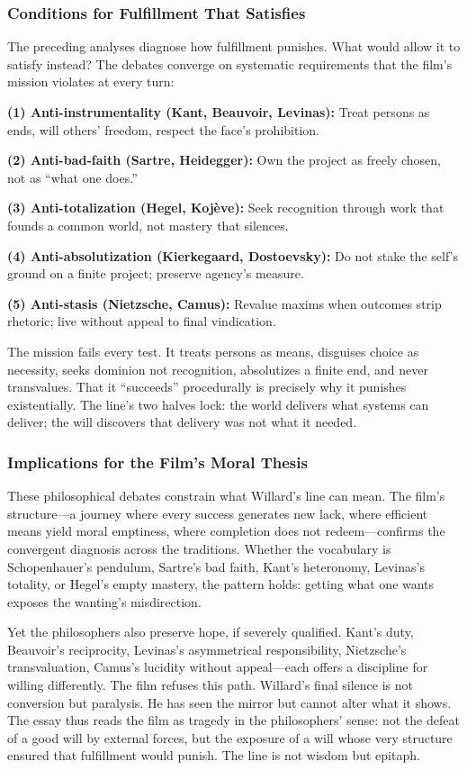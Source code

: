 \subsubsection*{Conditions for Fulfillment That Satisfies}

The preceding analyses diagnose how fulfillment punishes. What would allow it to satisfy
instead? The debates converge on systematic requirements that the film's mission violates at
every turn:

\textbf{(1) Anti-instrumentality (Kant, Beauvoir, Levinas):} Treat persons as ends, will
others' freedom, respect the face's prohibition.

\textbf{(2) Anti-bad-faith (Sartre, Heidegger):} Own the project as freely chosen, not as
``what one does.''

\textbf{(3) Anti-totalization (Hegel, Kojève):} Seek recognition through work that founds a
common world, not mastery that silences.

\textbf{(4) Anti-absolutization (Kierkegaard, Dostoevsky):} Do not stake the self's ground on
a finite project; preserve agency's measure.

\textbf{(5) Anti-stasis (Nietzsche, Camus):} Revalue maxims when outcomes strip rhetoric; live
without appeal to final vindication.

The mission fails every test. It treats persons as means, disguises choice as necessity, seeks
dominion not recognition, absolutizes a finite end, and never transvalues. That it
``succeeds'' procedurally is precisely why it punishes existentially. The line's two halves
lock: the world delivers what systems can deliver; the will discovers that delivery was not
what it needed.

\subsubsection*{Implications for the Film's Moral Thesis}

These philosophical debates constrain what Willard's line can mean. The film's structure---a
journey where every success generates new lack, where efficient means yield moral emptiness,
where completion does not redeem---confirms the convergent diagnosis across the traditions.
Whether the vocabulary is Schopenhauer's pendulum, Sartre's bad faith, Kant's heteronomy,
Levinas's totality, or Hegel's empty mastery, the pattern holds: getting what one wants
exposes the wanting's misdirection.

Yet the philosophers also preserve hope, if severely qualified. Kant's duty, Beauvoir's
reciprocity, Levinas's asymmetrical responsibility, Nietzsche's transvaluation, Camus's
lucidity without appeal---each offers a discipline for willing differently. The film refuses
this path. Willard's final silence is not conversion but paralysis. He has seen the mirror but
cannot alter what it shows. The essay thus reads the film as tragedy in the philosophers'
sense: not the defeat of a good will by external forces, but the exposure of a will whose very
structure ensured that fulfillment would punish. The line is not wisdom but epitaph.
